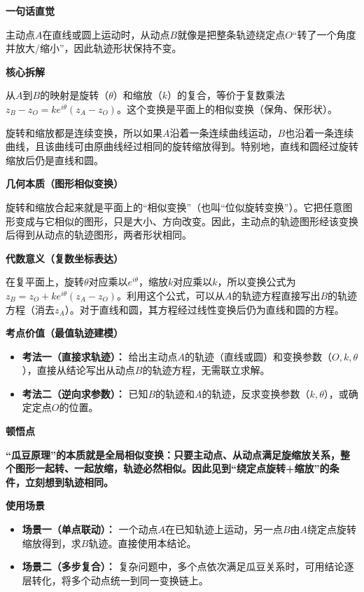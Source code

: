 \begin{explanationbox}
	\textbf{\textcolor{CExplanation}{一句话直觉}}

	主动点$A$在直线或圆上运动时，从动点$B$就像是把整条轨迹绕定点$O$“转了一个角度并放大/缩小”，因此轨迹形状保持不变。

	\medskip
	\textbf{\textcolor{CExplanation}{核心拆解}}
	\begin{description}[style=nextline, leftmargin=2.8em, labelsep=0.5em, itemsep=0.45em]
		\item[\textbf{要点一（变换本质）：}] 从$A$到$B$的映射是旋转（$\theta$）和缩放（$k$）的复合，等价于复数乘法 $z_B - z_O = k e^{i\theta}(z_A - z_O)$。这个变换是平面上的相似变换（保角、保形状）。
		\item[\textbf{要点二（轨迹保持）：}] 旋转和缩放都是连续变换，所以如果$A$沿着一条连续曲线运动，$B$也沿着一条连续曲线，且该曲线可由原曲线经过相同的旋转缩放得到。特别地，直线和圆经过旋转缩放后仍是直线和圆。
	\end{description}

	\medskip
	\textbf{\textcolor{CExplanation}{几何本质（图形相似变换）}}

	旋转和缩放合起来就是平面上的“相似变换”（也叫“位似旋转变换”）。它把任意图形变成与它相似的图形，只是大小、方向改变。因此，主动点的轨迹图形经该变换后得到从动点的轨迹图形，两者形状相同。

	\medskip
	\textbf{\textcolor{CExplanation}{代数意义（复数坐标表达）}}

	在复平面上，旋转$\theta$对应乘以$e^{i\theta}$，缩放$k$对应乘以$k$，所以变换公式为 $z_B = z_O + k e^{i\theta}(z_A - z_O)$。利用这个公式，可以从$A$的轨迹方程直接写出$B$的轨迹方程（消去$z_A$）。对于直线和圆，其方程经过线性变换后仍为直线和圆的方程。

	\medskip
	\textbf{\textcolor{CExplanation}{考点价值（最值轨迹建模）}}
	\begin{itemize}[leftmargin=*, itemsep=0.5em, topsep=0.4em]
		\item \textbf{考法一（直接求轨迹）：} 给出主动点$A$的轨迹（直线或圆）和变换参数（$O,k,\theta$），直接从结论写出从动点$B$的轨迹方程，无需联立求解。
		\item \textbf{考法二（逆向求参数）：} 已知$B$的轨迹和$A$的轨迹，反求变换参数（$k,\theta$），或确定定点$O$的位置。
	\end{itemize}

	\medskip
	\textbf{\textcolor{CExplanation}{顿悟点}}

	\textbf{“瓜豆原理”的本质就是全局相似变换：只要主动点、从动点满足旋缩放关系，整个图形一起转、一起放缩，轨迹必然相似。因此见到“绕定点旋转+缩放”的条件，立刻想到轨迹相同。}

	\medskip
	\textbf{\textcolor{CExplanation}{使用场景}}
	\begin{itemize}[leftmargin=*, itemsep=0.5em, topsep=0.4em]
		\item \textbf{场景一（单点联动）：} 一个动点$A$在已知轨迹上运动，另一点$B$由$A$绕定点旋转缩放得到，求$B$轨迹。直接使用本结论。
		\item \textbf{场景二（多步复合）：} 复杂问题中，多个点依次满足瓜豆关系时，可用结论逐层转化，将多个动点统一到同一变换链上。
	\end{itemize}
\end{explanationbox}
